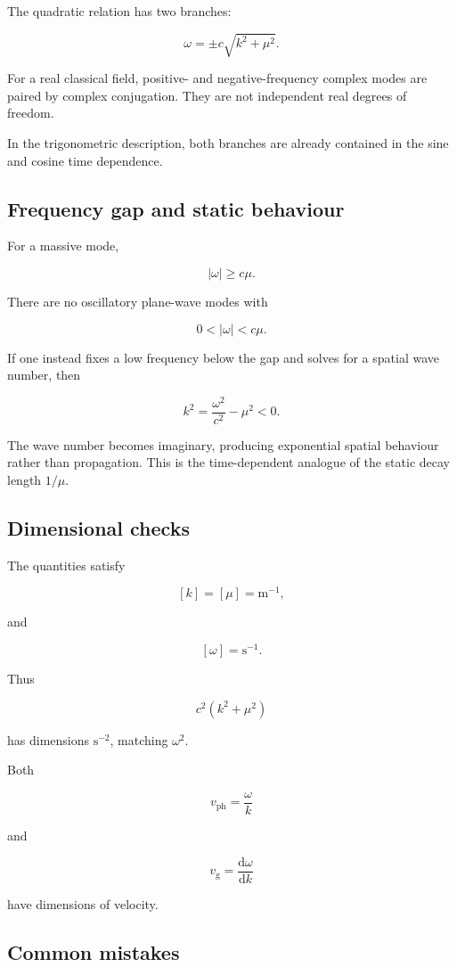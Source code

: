 The quadratic relation has two branches:

\[
\boxed{
\omega
=
\pm c\sqrt{k^{2}+\mu^{2}}
}.
\]

For a real classical field, positive- and negative-frequency complex modes are paired by complex conjugation. They are not independent real degrees of freedom.

In the trigonometric description, both branches are already contained in the sine and cosine time dependence.

\subsection{Frequency gap and static behaviour}

For a massive mode,

\[
|\omega|\geq c\mu.
\]

There are no oscillatory plane-wave modes with

\[
0<|\omega|<c\mu.
\]

If one instead fixes a low frequency below the gap and solves for a spatial wave number, then

\[
k^{2}
=
\frac{\omega^{2}}{c^{2}}
-
\mu^{2}<0.
\]

The wave number becomes imaginary, producing exponential spatial behaviour rather than propagation. This is the time-dependent analogue of the static decay length \(1/\mu\).

\subsection{Dimensional checks}

The quantities satisfy

\[
[k]=[\mu]=\mathrm{m}^{-1},
\]

and

\[
[\omega]=\mathrm{s}^{-1}.
\]

Thus

\[
c^{2}(k^{2}+\mu^{2})
\]

has dimensions \(\mathrm{s}^{-2}\), matching \(\omega^{2}\).

Both

\[
v_{\mathrm{ph}}=\frac{\omega}{k}
\]

and

\[
v_{\mathrm{g}}=\frac{\mathrm{d}\omega}{\mathrm{d}k}
\]

have dimensions of velocity.

\subsection{Common mistakes}

